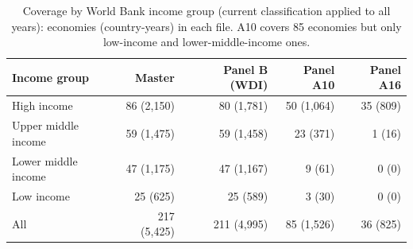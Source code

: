 \begin{table}[t]
\caption{Coverage by World Bank income group (current classification applied to all years): economies (country-years) in each file. A10 covers 85 economies but only \DEconTenLo{} low-income and \DEconTenLm{} lower-middle-income ones.}\label{tab:coverage}
\centering\small
\begin{tabular}{@{}lrrrr@{}}
\toprule
Income group & Master & Panel B (WDI) & Panel A10 & Panel A16 \\
\midrule
High income & 86 (2{,}150) & 80 (1{,}781) & 50 (1{,}064) & 35 (809) \\
Upper middle income & 59 (1{,}475) & 59 (1{,}458) & 23 (371) & 1 (16) \\
Lower middle income & 47 (1{,}175) & 47 (1{,}167) & 9 (61) & 0 (0) \\
Low income & 25 (625) & 25 (589) & 3 (30) & 0 (0) \\
\midrule
All & 217 (5{,}425) & 211 (4{,}995) & 85 (1{,}526) & 36 (825) \\
\bottomrule
\end{tabular}
\end{table}
